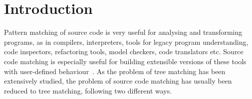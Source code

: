 
\section{Introduction}

Pattern matching of source code is very useful for analysing and
transforming programs, as in compilers, interpreters, tools for legacy
program understanding, code inspectors, refactoring tools, model
checkers, code translators etc. Source code matching is especially
useful for building extensible versions of these tools with
user\hyp{}defined behaviour~\cite{mc,mj,mops,blast}. As the problem of
tree matching has been extensively studied, the problem of source code
matching has usually been reduced to tree matching, following two
different ways.

